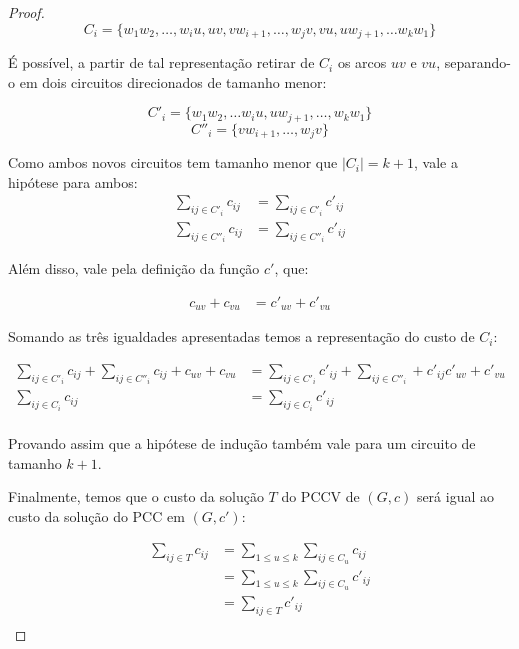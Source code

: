 \begin{proof}
            \[
                C_i = \{ w_1w_2, \dots, w_iu, uv, vw_{i+1}, \dots, w_jv,  vu, uw_{j+1}, \dots w_kw_1\}
            \]

            É possível, a partir de tal representação retirar de $C_i$ os arcos $uv$ e $vu$, separando-o em dois circuitos direcionados de tamanho menor:

            \[
                C'_i = \{w_1w_2, \dots w_iu, uw_{j+1}, \dots, w_kw_1\} 
            \]
            \[
                C''_i = \{vw_{i+1}, \dots, w_jv\}
            \]

            Como ambos novos circuitos tem tamanho menor que $|C_i| = k+1$, vale a hipótese para ambos:
            \begin{align}
                \sum_{ij \in C'_i} c_{ij} &= \sum_{ij \in C'_i} c'_{ij} \\
                \sum_{ij \in C''_i} c_{ij} &= \sum_{ij \in C''_i} c'_{ij}
            \end{align}
            
            Além disso, vale pela definição da função $c'$, que:
            
            \begin{align}
                c_{uv} + c_{vu}  &= c'_{uv} + c'_{vu} 
            \end{align}

            Somando as três igualdades apresentadas temos a representação do custo de $C_i$:

            \begin{align*}
                \sum_{ij \in C'_i} c_{ij} +  \sum_{ij \in C''_i} c_{ij} + c_{uv} + c_{vu}  &= \sum_{ij \in C'_i} c'_{ij} + \sum_{ij \in C''_i} + c'_{ij} c'_{uv} + c'_{vu}  \\
                \sum_{ij \in C_i} c_{ij} &= \sum_{ij \in C_i} c'_{ij} \\
            \end{align*}
             
            Provando assim que a hipótese de indução também vale para um circuito de tamanho $k+1$.

            Finalmente, temos que o custo da solução $T$ do PCCV de $(G, c)$ será igual ao custo da solução do PCC em $(G, c')$:

            \begin{align*}
                \sum_{ij \in T} c_{ij} &= \sum_{1 \leq u \leq k} \sum_{ij \in C_u} c_{ij} \\
                                       &= \sum_{1 \leq u \leq k} \sum_{ij \in C_u} c'_{ij} \\
                                       &= \sum_{ij \in T} c'_{ij} \\
            \end{align*}

        \end{proof}

